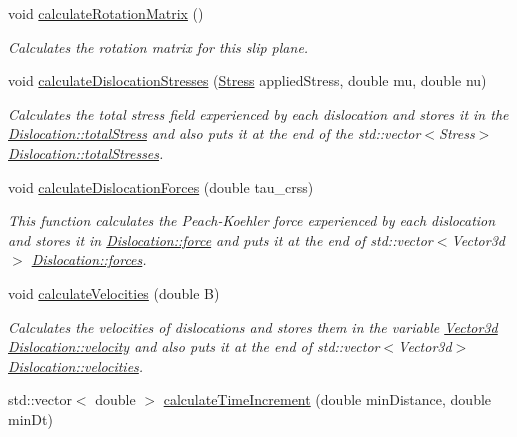 \begin{DoxyCompactItemize}
void \hyperlink{classSlipPlane_a5d9054f21be225f50860ad1351e3a86f}{calculate\-Rotation\-Matrix} ()
\begin{DoxyCompactList}\small\item\em Calculates the rotation matrix for this slip plane. \end{DoxyCompactList}\item 
void \hyperlink{classSlipPlane_a2d4d2d031502d4a6f0aebbad0990b882}{calculate\-Dislocation\-Stresses} (\hyperlink{classStress}{Stress} applied\-Stress, double mu, double nu)
\begin{DoxyCompactList}\small\item\em Calculates the total stress field experienced by each dislocation and stores it in the \hyperlink{classDislocation_ae27176c0d47fec3e188d7caa4c52f366}{Dislocation\-::total\-Stress} and also puts it at the end of the std\-::vector$<$\-Stress$>$ \hyperlink{classDislocation_adb36ed6c1772f2614ffbed4dcc748c13}{Dislocation\-::total\-Stresses}. \end{DoxyCompactList}\item 
void \hyperlink{classSlipPlane_ac16d1abbbc3b938b6f1f29a33a70212d}{calculate\-Dislocation\-Forces} (double tau\-\_\-crss)
\begin{DoxyCompactList}\small\item\em This function calculates the Peach-\/\-Koehler force experienced by each dislocation and stores it in \hyperlink{classDislocation_a9c19c7493d896bd845c489e1ec3cbbb6}{Dislocation\-::force} and puts it at the end of std\-::vector$<$\-Vector3d$>$ \hyperlink{classDislocation_aa8f4567bbfc6a58aaad01d5c423658c1}{Dislocation\-::forces}. \end{DoxyCompactList}\item 
void \hyperlink{classSlipPlane_aff7af69ba5235da6c8b142193509683c}{calculate\-Velocities} (double B)
\begin{DoxyCompactList}\small\item\em Calculates the velocities of dislocations and stores them in the variable \hyperlink{classVector3d}{Vector3d} \hyperlink{classDislocation_ad6f4e8e94b2525c2e58a77b9d2916c0e}{Dislocation\-::velocity} and also puts it at the end of std\-::vector$<$\-Vector3d$>$ \hyperlink{classDislocation_a9ccdef63384a8b965e70f13920a852f8}{Dislocation\-::velocities}. \end{DoxyCompactList}\item 
std\-::vector$<$ double $>$ \hyperlink{classSlipPlane_a255d67230132cf1c7bf18f61098a8b4f}{calculate\-Time\-Increment} (double min\-Distance, double min\-Dt)

\end{DoxyCompactItemize}
